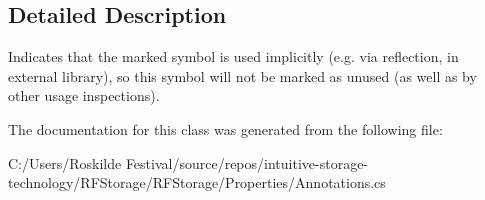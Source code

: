 \subsection{Detailed Description}
Indicates that the marked symbol is used implicitly (e.\+g. via reflection, in external library), so this symbol will not be marked as unused (as well as by other usage inspections). 



The documentation for this class was generated from the following file\+:\begin{DoxyCompactItemize}
\item 
C\+:/\+Users/\+Roskilde Festival/source/repos/intuitive-\/storage-\/technology/\+R\+F\+Storage/\+R\+F\+Storage/\+Properties/Annotations.\+cs\end{DoxyCompactItemize}
